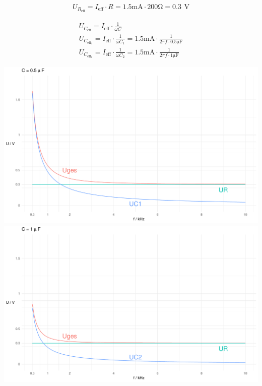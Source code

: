 \documentclass[a4paper, 12pt]{article}
\begin{document}
    \begin{gather*}
      U_{R_{\text{eff}}} = I_{\text{eff}} \cdot R = 1.5 \si{\milli\ampere} \cdot 200 \si{\ohm} = 0.3 \,\ \si{\volt}
    \end{gather*}

    \begin{gather*}
        U_{C_{\text{eff}}} = I_{\text{eff}} \cdot \frac{1}{\omega C}\\
        U_{C_{{\text{eff}}_1}} = I_{\text{eff}} \cdot \frac{1}{\omega C_1} = 1.5 \si{\milli\ampere} \cdot \frac{1}{2 \pi f \cdot 0.5 \si{\micro\farad}}\\
        U_{C_{{\text{eff}}_2}} = I_{\text{eff}} \cdot \frac{1}{\omega C_2} = 1.5 \si{\milli\ampere} \cdot \frac{1}{2 \pi f \cdot 1 \si{\micro\farad}}
    \end{gather*}

    \begin{center}
      \includegraphics[scale=0.5]{./R/2_4/2_4_1.pdf}\\
      \includegraphics[scale=0.5]{./R/2_4/2_4_2.pdf}
    \end{center}
\end{document}

